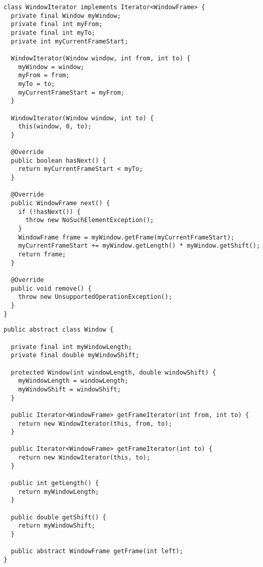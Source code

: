 \begin{lstlisting}[caption={Выбор очередной оконной функции}]
class WindowIterator implements Iterator<WindowFrame> {
  private final Window myWindow;
  private final int myFrom;
  private final int myTo;
  private int myCurrentFrameStart;

  WindowIterator(Window window, int from, int to) {
    myWindow = window;
    myFrom = from;
    myTo = to;
    myCurrentFrameStart = myFrom;
  }

  WindowIterator(Window window, int to) {
    this(window, 0, to);
  }

  @Override
  public boolean hasNext() {
    return myCurrentFrameStart < myTo;
  }

  @Override
  public WindowFrame next() {
    if (!hasNext()) {
      throw new NoSuchElementException();
    }
    WindowFrame frame = myWindow.getFrame(myCurrentFrameStart);
    myCurrentFrameStart += myWindow.getLength() * myWindow.getShift();
    return frame;
  }

  @Override
  public void remove() {
    throw new UnsupportedOperationException();
  }
}
\end{lstlisting}

\begin{lstlisting}[caption={Абстрактное окно}]
public abstract class Window {

  private final int myWindowLength;
  private final double myWindowShift;

  protected Window(int windowLength, double windowShift) {
    myWindowLength = windowLength;
    myWindowShift = windowShift;
  }

  public Iterator<WindowFrame> getFrameIterator(int from, int to) {
    return new WindowIterator(this, from, to);
  }

  public Iterator<WindowFrame> getFrameIterator(int to) {
    return new WindowIterator(this, to);
  }

  public int getLength() {
    return myWindowLength;
  }

  public double getShift() {
    return myWindowShift;
  }

  public abstract WindowFrame getFrame(int left);
}
\end{lstlisting}

